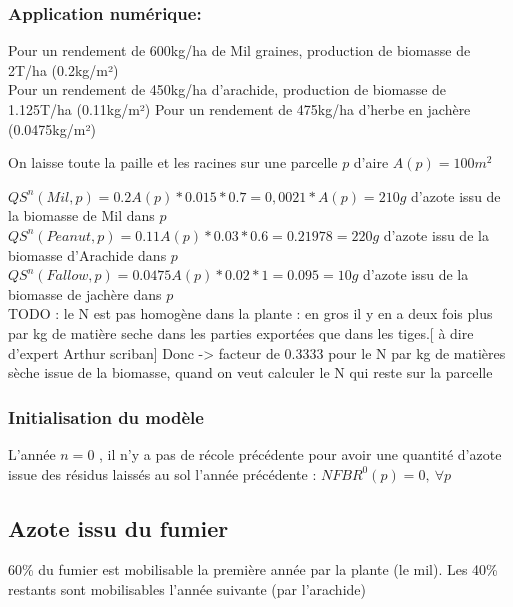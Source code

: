 \documentclass[10pt,a4paper,french]{article} %
\begin{document}
\subsubsection{Application numérique:} 

Pour un rendement de 600kg/ha de Mil graines, production de biomasse de 2T/ha (0.2kg/m²)\\
Pour un rendement de 450kg/ha d'arachide, production de biomasse de 1.125T/ha (0.11kg/m²)
Pour un rendement de 475kg/ha d'herbe en jachère (0.0475kg/m²) 



On laisse toute la paille et les racines sur une parcelle $p$ d'aire $A(p)=100m^2$


$QS^{n}(Mil, p)= 0.2 A(p)* 0.015 * 0.7 = 0,0021* A(p)= 210g$ d'azote issu de la biomasse de Mil dans $p$ \\
$QS^{n}(Peanut, p)= 0.11 A(p) * 0.03 * 0.6 = 0.21978 = 220g$ d'azote issu de la biomasse d'Arachide  dans $p$\\
$QS^{n}(Fallow, p)= 0.0475 A(p)* 0.02 * 1 = 0.095 = 10g$ d'azote issu de la biomasse de jachère  dans $p$ \\



TODO : le N est pas homogène dans la plante : en gros il y en a deux fois plus par kg de matière seche dans les parties exportées que dans les tiges.[ à dire d'expert Arthur scriban]
Donc -> facteur de 0.3333 pour le N par kg de matières sèche  issue de la biomasse, quand on veut calculer le N qui reste sur la parcelle



\subsubsection{Initialisation du modèle}


L'année $n=0$ , il n'y a pas de récole précédente pour  avoir une quantité d'azote issue des résidus laissés au sol l'année précédente  : $NFBR^0(p)=0,\  \forall p$





\subsection{Azote issu du fumier}


60\% du fumier est mobilisable la première année par la plante (le mil).
Les 40\% restants sont mobilisables l'année suivante (par l'arachide)
\end{document}
